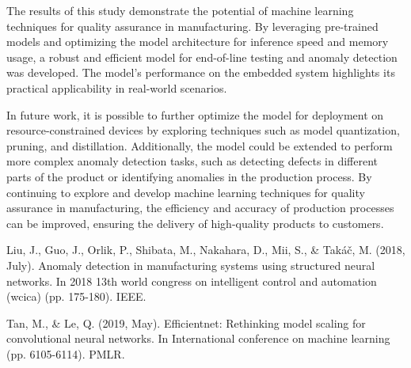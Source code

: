 \documentclass[lettersize,journal]{IEEEtran}
\begin{document}
The results of this study demonstrate the potential of machine learning techniques for quality assurance in manufacturing. By leveraging pre-trained models and optimizing the model architecture for inference speed and memory usage, a robust and efficient model for end-of-line testing and anomaly detection was developed. The model's performance on the embedded system highlights its practical applicability in real-world scenarios.

In future work, it is possible to further optimize the model for deployment on resource-constrained devices by exploring techniques such as model quantization, pruning, and distillation. Additionally, the model could be extended to perform more complex anomaly detection tasks, such as detecting defects in different parts of the product or identifying anomalies in the production process. By continuing to explore and develop machine learning techniques for quality assurance in manufacturing, the efficiency and accuracy of production processes can be improved, ensuring the delivery of high-quality products to customers.

\begin{thebibliography}{1}



Liu, J., Guo, J., Orlik, P., Shibata, M., Nakahara, D., Mii, S., \&{} Takáč, M. (2018, July). Anomaly detection in manufacturing systems using structured neural networks. In 2018 13th world congress on intelligent control and automation (wcica) (pp. 175-180). IEEE.

Tan, M., \& Le, Q. (2019, May). Efficientnet: Rethinking model scaling for convolutional neural networks. In International conference on machine learning (pp. 6105-6114). PMLR.

\end{thebibliography}

\vfill
\end{document}
